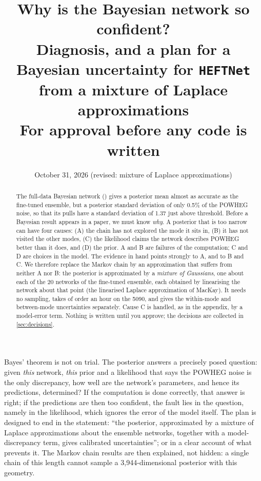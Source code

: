 
\newcommand{\what}{\hat{\boldsymbol{\omega}}}

\title{\textbf{Why is the Bayesian network so confident?}\\[4pt]
\large Diagnosis, and a plan for a Bayesian uncertainty for \texttt{HEFTNet}\\
\large from a mixture of Laplace approximations\\[4pt]
\normalsize For approval before any code is written}
\date{October 31, 2026 (revised: mixture of Laplace approximations)}


\maketitle

\begin{abstract}
\noindent
The full-data Bayesian network () gives a posterior mean
almost as accurate as the fine-tuned ensemble, but a posterior standard deviation of only
0.5\% of the POWHEG noise, so that its pulls have a standard deviation of 1.37 just above
threshold. Before a Bayesian result appears in a paper, we must know \emph{why}. A
posterior that is too narrow can have four causes: (A) the chain has not explored the mode
it sits in, (B) it has not visited the other modes, (C) the likelihood claims the network
describes POWHEG better than it does, and (D) the prior. A and B are failures of the
computation; C and D are choices in the model. The evidence in hand points strongly to A,
and to B and C. We therefore replace the Markov chain by an approximation that suffers from
neither A nor B: the posterior is approximated by a \emph{mixture of Gaussians}, one about
each of the 20 networks of the fine-tuned ensemble, each obtained by linearising the
network about that point (the linearised Laplace approximation of MacKay). It needs no
sampling, takes of order an hour on the 5090, and gives the within-mode and between-mode
uncertainties separately. Cause C is handled, as in the appendix, by a model-error term.
Nothing is written until you approve; the decisions are collected in
\cref{sec:decisions}.
\end{abstract}

\begin{keyidea}
Bayes' theorem is not on trial. The posterior answers a precisely posed question: given
\emph{this} network, \emph{this} prior and a likelihood that says the POWHEG noise is the
only discrepancy, how well are the network's parameters, and hence its predictions,
determined? If the computation is done correctly, that answer is right; if the predictions
are then too confident, the fault lies in the question, namely in the likelihood, which
ignores the error of the model itself. The plan is designed to end in the statement: ``the
posterior, approximated by a mixture of Laplace approximations about the ensemble networks,
together with a model-discrepancy term, gives calibrated uncertainties''; or in a clear
account of what prevents it. The Markov chain results are then explained, not hidden: a
single chain of this length cannot sample a 3,944-dimensional posterior with this
geometry.
\end{keyidea}

